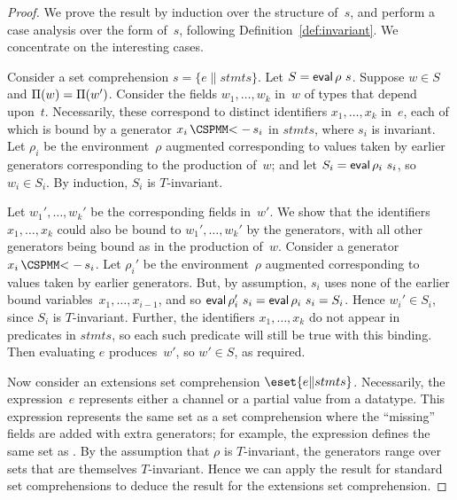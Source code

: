\begin{proof}
We prove the result by induction over the structure of~$s$, and perform a case
analysis over the form of~$s$, following Definition~\ref{def:invariant}.  We
concentrate on the interesting cases.

Consider a set comprehension $s = \{ e \| stmts\}$.  Let $S = \mathop{\sf eval} \rho~s$.
Suppose $w \in S$ and $\Pi(w) = \Pi(w')$.  Consider the fields
$w_1,\ldots,w_k$ in~$w$ of types that depend upon~$t$.  Necessarily, these
correspond to distinct identifiers $x_1,\ldots,x_k$ in~$e$, each of which is
bound by a generator $x_i \,\M{<-}\, s_i$ in $stmts$, where $s_i$ is
invariant.  Let $\rho_i$ be the environment~$\rho$ augmented corresponding to
values taken by earlier generators corresponding to the production of~$w$; and
let $S_i = \mathop{\sf eval} \rho_i~s_i$, so $w_i \in S_i$.  By induction, $S_i$ is
$T$-invariant.

Let $w_1',\ldots,w_k'$ be the corresponding fields in~$w'$.  We show that the
identifiers $x_1,\ldots,x_k$ could also be bound to $w_1',\ldots,w_k'$ by the
generators, with all other generators being bound as in the production of~$w$.
Consider a generator $x_i \,\M{<-}\, s_i$.  Let $\rho_i'$ be the
environment~$\rho$ augmented corresponding to values taken by earlier
generators.  But, by assumption, $s_i$ uses none of the earlier bound
variables~$x_1,\ldots,x_{i-1}$, and so $\mathop{\sf eval} \rho_i'~s_i = \mathop{\sf eval} \rho_i~s_i =
S_i$.  Hence $w_i' \in S_i$, since $S_i$ is $T$-invariant.  Further, the
identifiers $x_1,\ldots,x_k$ do not appear in predicates in $stmts$, so each
such predicate will still be true with this binding.  Then evaluating $e$
produces~$w'$, so $w' \in S$, as required.

Now consider an extensions set comprehension $\eset{e \| stmts}$.
Necessarily, the expression~$e$ represents either a channel or a partial value
from a datatype.  This expression represents the same set as a set
comprehension where the ``missing'' fields are added with extra generators;
for example, the expression   defines the same set as
.  By the assumption that $\rho$ is
$T$-invariant, the generators range over sets that are themselves
$T$-invariant.  Hence we can apply the result for standard set comprehensions
to deduce the result for the extensions set comprehension. 
\end{proof}


